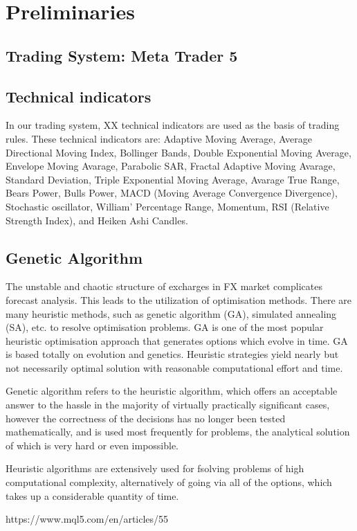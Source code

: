 \section{Preliminaries}

\subsection{Trading System: Meta Trader 5}

\subsection{Technical indicators}
In our trading system, XX technical indicators are used as the basis of trading rules. These technical indicators are: Adaptive Moving Average, Average Directional Moving Index, Bollinger Bands, Double Exponential Moving Average, Envelope Moving Avarage, Parabolic SAR, Fractal Adaptive Moving Avarage, Standard Deviation, Triple Exponential Moving Average, Avarage True Range, Bears Power, Bulls Power, MACD (Moving Average Convergence Divergence), Stochastic oscillator, William' Percentage Range, Momentum, RSI (Relative Strength Index), and Heiken Ashi Candles.

\subsection{Genetic Algorithm}
The unstable and chaotic structure of excharges in FX market complicates forecast analysis. This leads to the utilization of optimisation methods. There are many heuristic methods, such as genetic algorithm (GA), simulated annealing (SA), etc. to resolve optimisation problems. GA is one of the most popular heuristic optimisation approach that generates options which evolve in time. GA is based totally on evolution and genetics. Heuristic strategies yield nearly but not necessarily optimal solution with reasonable computational effort and time.

Genetic algorithm refers to the heuristic algorithm, which offers an acceptable answer to the hassle in the majority of virtually practically significant cases, however the correctness of the decisions has no longer been tested mathematically, and is used most frequently for problems, the analytical solution of which is very hard or even impossible.

Heuristic algorithms are extensively used for fsolving problems of high computational complexity, alternatively of going via all of the options, which takes up a considerable quantity of time.

https://www.mql5.com/en/articles/55